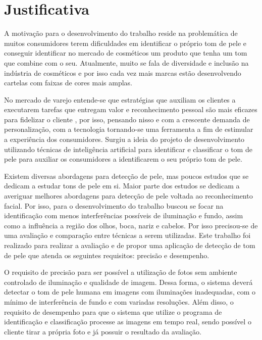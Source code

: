 \section{Justificativa}
\label{justificativa}

A motivação para o desenvolvimento do trabalho reside na problemática de muitos consumidores terem dificuldades em identificar o próprio tom de pele e conseguir identificar no mercado de cosméticos um produto que tenha um tom que combine com o seu. Atualmente, muito se fala de diversidade e inclusão na indústria de cosméticos e por isso cada vez mais marcas estão desenvolvendo cartelas com faixas de cores mais amplas.

No mercado de varejo entende-se que estratégias que auxiliam os clientes a executarem tarefas que entregam valor e reconhecimento pessoal são mais eficazes para fidelizar o cliente \cite{Snap_and_match_a_case_study_of_virtual_color_cosmetics_consultation}, por isso, pensando nisso e com a crescente demanda de personalização, com a tecnologia tornando-se uma ferramenta a fim de estimular a experiência dos consumidores. Surgiu a ideia do projeto de desenvolvimento utilizando técnicas de inteligência artificial para identificar e classificar o tom de pele para auxiliar os consumidores a identificarem o seu próprio tom de pele. 

Existem diversas abordagens para detecção de pele, mas poucos estudos que se dedicam a estudar tons de pele em si. Maior parte dos estudos se dedicam a averiguar melhores abordagens para detecção de pele voltada ao reconhecimento facial. Por isso, para o desenvolvimento do trabalho buscou se focar na identificação com menos interferências possíveis de iluminação e fundo, assim como a influência a região dos olhos, boca, nariz e cabelos. Por isso precisou-se de uma avaliação e comparação entre técnicas a serem utilizadas. Este trabalho foi realizado para realizar a avaliação e de propor uma aplicação de detecção de tom de pele que atenda os seguintes requisitos: precisão e desempenho.

O requisito de precisão para ser possível a utilização de fotos sem ambiente controlado de iluminação e qualidade de imagem. Dessa forma, o sistema deverá detectar o tom de pele humana em imagens com iluminações inadequadas, com o mínimo de interferência de fundo e com variadas resoluções. Além disso, o requisito de desempenho para que o sistema que utilize o programa de identificação e classificação processe as imagens em tempo real, sendo possível o cliente tirar a própria foto e já possuir o resultado da avaliação.


